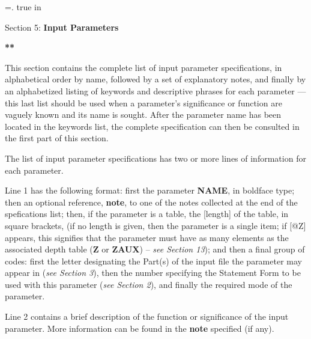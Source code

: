 %
\newtoks\footline \footline={\hss{}.\folio\hss}
\def\pa{$\times 10^{4}$}
\def\pb{$\times 10^{5}$}
\def\pc{$\times 10^{6}$}
\def\pd{$\times 10^{7}$}
\def\pe{$\times 10^{8}$}
\def\pf{$\times 10^{9}$}
\def\pg{$\times 10^{10}$}
\def\ph{$\times 10^{11}$}
\def\pj{$\times 10^{12}$}
\def\pk{$\times 10^{13}$}
\def\pl{$\times 10^{14}$}
\def\pm{$\times 10^{15}$}
\def\pn{$\times 10^{16}$}
\def\po{$\times 10^{17}$}
\def\z{[@Z]}
\def\Na{\space \vbox}
\def\bang{\cr \par \hangindent=10pt \hangafter=0}
\def\Df{\par \hangindent=10pt \hangafter=0 {\it Default: }}
\top
{} true in
\centerline{Section 5: {\bf Input Parameters}}
\blankline
\blankline
\centerline{\bf ***}
\blankline
\blankline
This section contains the complete list of input parameter specifications,
in alphabetical order by name, followed by a set of explanatory notes,
and finally by an alphabetized listing of keywords and descriptive
phrases for each parameter --- this last list should be used
when a parameter's significance or function are vaguely known and
its name is sought. After the parameter name has been located
in the keywords list, the complete specification can then be
consulted in the first part of this section.

The list of input parameter specifications has two or more lines
of information for each parameter.

Line 1 has the following format:
first the parameter {\bf NAME}, in boldface type; then an optional
reference, {\bf *note}, to one of the notes collected at the end
of the spefications list; then, if the parameter is a table, 
the [length] of the table, in square brackets, (if no length is
given, then the parameter is a single item; if {\z} appears, this
signifies that the parameter must have as many elements as the
associated depth table ({\bf Z} or {\bf ZAUX}) -- {\it see Section 13}); 
and then a final group of codes: 
\bull first the letter designating the Part(s) of the input
file the parameter may appear in ({\it see Section 3}),
\bull then the number specifying the Statement Form to be used with this
parameter ({\it see Section 2}), and
\bull finally the required mode of the parameter.

Line 2 contains a brief description of the function or significance 
of the input parameter. More information can be found in the {\bf *note}
specified (if any).

